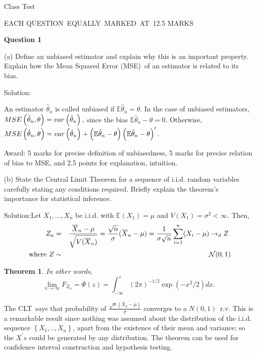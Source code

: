 \documentclass{article}
\newtheorem{theorem}{Theorem}
\begin{document}
\begin{center}
{\Large Class Test}
\end{center}

EACH QUESTION\ EQUALLY\ MARKED\ AT\ 12.5 MARKS\bigskip

\textbf{Question 1}

(a) Define an unbiased estimator and explain why this is an important
property. Explain how the Mean Squared Error (MSE)\ of an estimator is
related to its bias.

Solution:

An estimator $\hat{\theta}_{n}$ is called unbiased if $\mathbb{E}\hat{\theta}%
_{n}\mathbb{=\theta }$. In the case of unbiased estimators, $MSE\left( \hat{%
\theta}_{n},\theta \right) =var\left( \hat{\theta}_{n}\right) ,$ since the
bias $\mathbb{E}\hat{\theta}_{n}-\theta =0$. Otherwise, $MSE\left( \hat{%
\theta}_{n},\theta \right) =var\left( \hat{\theta}_{n}\right) +\left( 
\mathbb{E}\hat{\theta}_{n}-\theta \right) \left( \mathbb{E}\hat{\theta}%
_{n}-\theta \right) ^{\prime }.$

Award: 5 marks for precise definition of unbiasedness, 5 marks for precise
relation of bias to MSE, and 2.5 points for explanation, intuition.

(b) State the Central Limit Theorem for a sequence of i.i.d. random
variables carefully stating any conditions required. Briefly explain the
theorem's importance for statistical inference.

\bigskip

Solution:Let $X_{1},...,X_{n}$ be i.i.d. with $\mathbb{E}\left( X_{1}\right)
=\mu $ and $V\left( X_{1}\right) =\sigma ^{2}<\infty .$ Then, 
\begin{eqnarray*}
Z_{n} &=&\frac{\overline{X}_{n}-\mu }{\sqrt{V(\overline{X}_{n})}}=\frac{%
\sqrt{n}}{\sigma }(\overline{X}_{n}-\mu )=\frac{1}{\sigma \sqrt{n}}%
\sum_{i=1}^{n}(X_{i}-\mu )\rightarrow _{d}Z\text{ } \\
\text{\ where }Z &\sim &\mathcal{N}(0,1)
\end{eqnarray*}

\begin{theorem}
In other words, 
\begin{equation*}
\lim_{n\rightarrow \infty }F_{Z_{n}}=\Phi (z)=\int_{-\infty }^{z}(2\pi
)^{-1/2}\exp (-x^{2}/2)dx.
\end{equation*}
\end{theorem}

The CLT\ says that probability of $\frac{\sqrt{n}\left( \bar{X}_{n}-\mu
\right) }{\sigma }$ converges to a $N\left( 0,1\right) $\ r.v. This is a
remarkable result since nothing was assumed about the distribution of the
i.i.d. sequence $\left\{ X_{1},..,X_{n}\right\} $, apart from the existence
of their mean and variance; so the $X^{\prime }s$ could be generated by any
distribution. The theorem can be used for confidence interval construction
and hypothesis testing.
\end{document}
